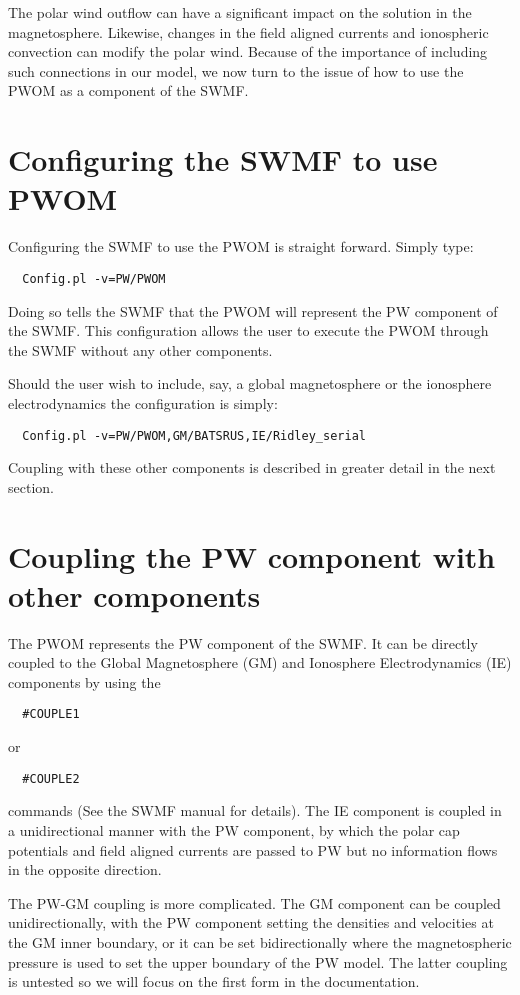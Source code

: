 The polar wind outflow can have a significant impact on the solution in the 
magnetosphere. Likewise, changes in the field aligned currents and ionospheric 
convection can modify the polar wind. Because of the importance of including 
such connections in our model, we now turn to the issue of how to use the 
PWOM as a component of the SWMF. 

\section{Configuring the SWMF to use PWOM}
Configuring the SWMF to use the PWOM is straight forward. Simply type:
\begin{verbatim}
  Config.pl -v=PW/PWOM
\end{verbatim}
Doing so tells the SWMF that the PWOM will represent the PW component of the 
SWMF. This configuration allows the user to execute the PWOM through the 
SWMF without any other components.

Should the user wish to include, say, a global magnetosphere or the 
ionosphere electrodynamics the configuration is simply:
\begin{verbatim}
  Config.pl -v=PW/PWOM,GM/BATSRUS,IE/Ridley_serial
\end{verbatim}
Coupling with these other components is described in greater detail in the 
next section.

\section{Coupling the PW component with other components}
The PWOM represents the PW component of the SWMF. It can be directly coupled 
to the Global Magnetosphere (GM) and Ionosphere Electrodynamics (IE) components 
by using the
\begin{verbatim}
  #COUPLE1
\end{verbatim}
 or
\begin{verbatim}
  #COUPLE2
\end{verbatim}
commands (See the SWMF manual for details). The IE component is coupled 
in a unidirectional manner with the PW component, by which the polar cap 
potentials and field aligned currents are passed to PW but no information 
flows in the opposite direction. 

The PW-GM coupling is more complicated. The GM component can be coupled 
unidirectionally, with the PW component setting the densities and velocities at 
the GM inner boundary, or it can be set bidirectionally where the 
magnetospheric pressure is used to set the upper boundary of the PW model. 
The latter coupling is untested so we will focus on the first form in the 
documentation.

